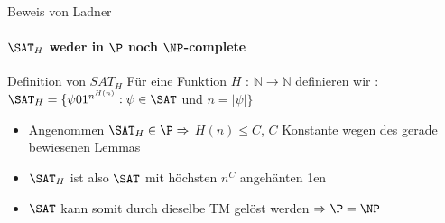 % 				
% 		
% 	
% 	
\begin{frame}{Beweis von Ladner}
	\framesubtitle{${\SAT}_H$ weder in $\P$ noch  $\NP$-complete}
	\begin{KITinfoblock}{Definition von ${SAT}_H$}
		Für eine Funktion $H$ : $\mathbb{N} \rightarrow \mathbb{N}$ definieren wir : \newline 	
		${\SAT}_H = \lbrace \psi 01^{n^{H(n)}} : \psi \in \SAT$ und $ n = |\psi| \rbrace$
	\end{KITinfoblock}
	\bigskip
	\pause
	\bigskip
	\begin{itemize}[<+->]
		\item Angenommen ${\SAT}_H \in \P \Rightarrow $  $H(n) \le C$, $C$ Konstante wegen des gerade bewiesenen Lemmas
		\item ${\SAT}_H$ ist also $\SAT$  mit höchsten $n^C$  angehänten 1en
		\item $\SAT$ kann somit durch dieselbe TM gelöst werden $\Rightarrow \P = \NP$
	\end{itemize}
	
\end{frame}

